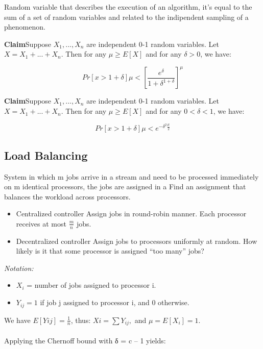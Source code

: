 \documentclass[11pt]{article}
\newenvironment{claim}[1]{\par\textbf{Claim}\space#1}{}
\begin{document}
Random variable that describes the execution of an algorithm, it's equal to the sum of a set of random variables and related to the indipendent sampling of a phenomenon.

\begin{claim}
Suppose $X_{1}, ..., X_{n}$ are independent 0-1 random variables. Let $X = X_{1} + ... + X_{n}$. Then for any $μ \geq E[X]$ and for any $δ > 0$, we have:

\[Pr[x>1+δ]μ <[\frac{e^{δ}}{1+δ^{1+δ}}]^{μ }\]
\end{claim}

\begin{claim}
Suppose $X_{1}, ..., X_{n}$ are independent 0-1 random variables. Let $X = X_{1} + ... + X_{n}$. Then for any $μ \geq E[X]$ and for any $0<δ<1$, we have:

\[Pr[x>1+δ]μ <e^{-δ^{2}\frac{μ}{2}}\]
\end{claim}


\subsection{Load Balancing}
System in which m jobs arrive in a stream and need to be processed immediately on m identical processors, the jobs are assigned in a  Find an assignment that balances the workload across processors.

\begin{itemize}
\item{Centralized controller}
Assign jobs in round-robin manner. Each processor receives at most $\frac{m}{n}$ jobs.
\item{Decentralized controller}
Assign jobs to processors uniformly at random. How likely is it that some processor is assigned “too many” jobs?

\end{itemize}

\emph{Notation:}

\begin{itemize}
\item{$X_{i}$ = number of jobs assigned to processor i.}
\item{$Y_{ij} = 1$ if job j assigned to processor i, and 0 otherwise.}
\end{itemize}

We have $E[Yij] = \frac{1}{n}$, thus: $Xi = \sum Y_{ij}  ,$ and $μ = E[X_{i}] = 1$.\\\\
Applying the Chernoff bound  with δ = c – 1 yields:
\end{document}
